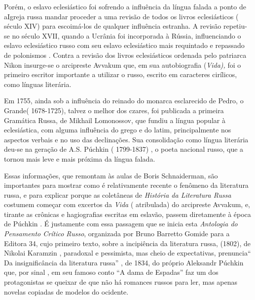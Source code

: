 Porém, o eslavo eclesiástico foi sofrendo a influência da língua falada
a ponto de aIgreja russa mandar proceder a uma revisão de todos os
livros eclesiásticos ( século XIV) para escoimá-los de qualquer
influência estranha. A revisão repetiu-se no século XVII, quando a
Ucrânia foi incorporada à Rússia, influenciando o eslavo eclesiástico
russo com seu eslavo eclesiástico mais requintado e repassado de
polonismos . Contra a revisão dos livros eclesiásticos ordenada pelo
patriarca Nikon insurge-se o arcipreste Avvakum que, em sua
autobiografia (\emph{Vida),} foi o primeiro escritor importante a
utilizar o russo, escrito em caracteres cirílicos, como línguas
literária.

Em 1755, ainda sob a influência do reinado do monarca esclarecido de
Pedro, o Grande( 1678-1725), talvez o melhor dos czares, foi publicada a
primeira Gramática Russa, de Mikhail Lomonossov, que fundiu a língua
popular à eclesiástica, com alguma influência do grego e do latim,
principalmente nos aspectos verbais e no uso das declinações. Sua
consolidação como língua literária deu-se na geração de A.S. Púchkin (
1799-1837) , o poeta nacional russo, que a tornou mais leve e mais
próxima da língua falada.

Essas informações, que remontam às aulas de Boris Schnaiderman, são
importantes para mostrar como é relativamente recente o fenômeno da
literatura russa, e para explicar porque as coletâneas de \emph{História
da Literatura Russa} costumem começar com excertos da \emph{Vida} (
atribulada) do arcipreste Avvakum, e, tirante as crônicas e hagiografias
escritas em eslavão, passem diretamente à época de Púchkin . É
justamente com essa passagem que se inicia esta \emph{Antologia do
Pensamento Crítico Russo}, organizada por Bruno Barretto Gomide para a
Editora 34, cujo primeiro texto, sobre a incipiência da literatura
russa, (1802), de Nikolai Karamzin , paradoxal e pessimista, mas cheio
de expectativas, prenuncia`` Da insignificância da literatura russa'' ,
de 1834, do próprio Aleksandr Púchkin que, por sinal , em seu famoso
conto ``A dama de Espadas'' faz um dos protagonistas se queixar de que
não há romances russos para ler, mas apenas novelas copiadas de modelos
do ocidente.

